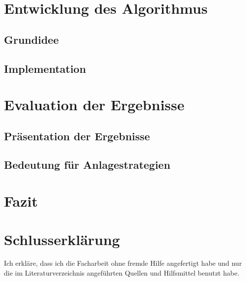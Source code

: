 \documentclass[12pt, a4paper, titlepage]{report}
\begin{document}
    \chapter{Entwicklung des Algorithmus}

        \section{Grundidee}

        \section{Implementation}

    \chapter{Evaluation der Ergebnisse}

        \section{Präsentation der Ergebnisse}

        \section{Bedeutung für Anlagestrategien}

    \chapter{Fazit}

    \chapter{Schlusserklärung}
        Ich erkläre, dass ich die Facharbeit ohne fremde Hilfe angefertigt habe
        und nur die im Literaturverzeichnis angeführten Quellen und Hilfsmittel benutzt habe.
\end{document}
